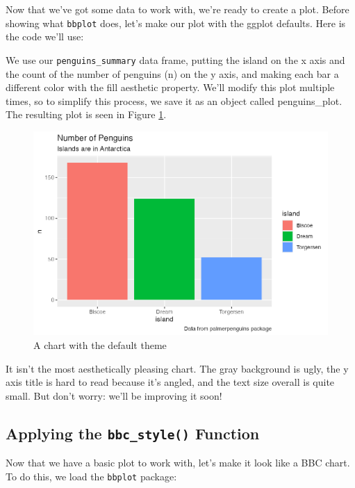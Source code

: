 \documentclass[
]{book}
\begin{document}
Now that we've got some data to work with, we're ready to create a plot. Before showing what \texttt{bbplot} does, let's make our plot with the ggplot defaults. Here is the code we'll use:

We use our \texttt{penguins\_summary} data frame, putting the island on the x axis and the count of the number of penguins (n) on the y axis, and making each bar a different color with the fill aesthetic property. We'll modify this plot multiple times, so to simplify this process, we save it as an object called penguins\_plot. The resulting plot is seen in Figure \ref{fig:basic-penguins-plot-plot}.

\begin{figure}
\includegraphics[width=1\linewidth]{custom-theme_files/figure-latex/basic-penguins-plot-plot-1} \caption{A chart with the default theme}\label{fig:basic-penguins-plot-plot}
\end{figure}

It isn't the most aesthetically pleasing chart. The gray background is ugly, the y axis title is hard to read because it's angled, and the text size overall is quite small. But don't worry: we'll be improving it soon!

\hypertarget{applying-the-bbc_style-function}{%
\subsection*{\texorpdfstring{Applying the \texttt{bbc\_style()} Function}{Applying the bbc\_style() Function}}\label{applying-the-bbc_style-function}}

Now that we have a basic plot to work with, let's make it look like a BBC chart. To do this, we load the \texttt{bbplot} package:
\end{document}
